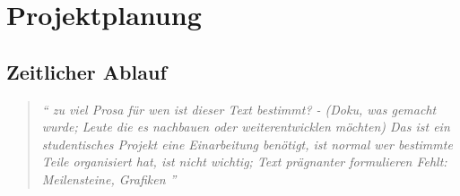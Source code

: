 \chapter{Projektplanung}

\section{Zeitlicher Ablauf}


\begin{quote}
	\textit{
		\enquote{
		zu viel Prosa
		für wen ist dieser Text bestimmt? - (Doku, was gemacht wurde; Leute die es nachbauen oder weiterentwicklen möchten)
		Das ist ein studentisches Projekt eine Einarbeitung benötigt, ist normal
		wer bestimmte Teile organisiert hat, ist nicht wichtig;
		Text prägnanter formulieren
		Fehlt: Meilensteine, Grafiken
		}
	}
	\cite{Spale.2014}
\end{quote}


